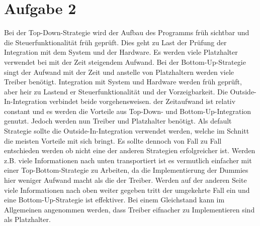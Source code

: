\documentclass[a4paper]{report}
\begin{document}
\newpage\section*{Aufgabe 2}

Bei der Top-Down-Strategie wird der Aufbau des Programms früh sichtbar und die Steuerfunktionalität früh geprüft. Dies geht zu Last der Prüfung der Integration mit dem System und der Hardware. Es werden viele Platzhalter verwendet bei mit der Zeit steigendem Aufwand.
Bei der Bottom-Up-Strategie singt der Aufwand mit der Zeit und anstelle von Platzhaltern werden viele Treiber benötigt. Integration mit System und Hardware werden früh geprüft, aber heir zu Lastend er Steuerfunktionalität und der Vorzeigbarkeit.
Die Outside-In-Integration verbindet beide vorgehensweisen. der Zeitaufwand ist relativ constant und es werden die Vorteile aus Top-Down- und Bottom-Up-Integration genutzt. Jedoch werden nun Treiber und Platzhalter benötigt.
Als default Strategie sollte die Outside-In-Integration verwendet werden, welche im Schnitt die meisten Vorteile mit sich bringt. Es sollte dennoch von Fall zu Fall entschieden werden ob nicht eine der anderen Strategien erfolgreicher ist. Werden z.B. viele Informationen nach unten transportiert ist es vermutlich einfacher mit einer Top-Bottom-Strategie zu Arbeiten, da die Implementierung der Dummies hier weniger Aufwand macht als die der Treiber. Werden auf der anderen Seite viele Informationen nach oben weiter gegeben tritt der umgekehrte Fall ein und eine Bottom-Up-Strategie ist effektiver. Bei einem Gleichstand kann im Allgemeinen angenommen werden, dass Treiber eifnacher zu Implementieren sind als Platzhalter.
\end{document}
